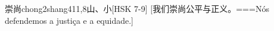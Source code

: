 \begin{EntryWithPhonetic}{崇尚}{chong2shang4}{11,8}{⼭、⼩}[HSK 7-9]
  [我们崇尚公平与正义。===Nós defendemos a justiça e a equidade.]
\end{EntryWithPhonetic}
